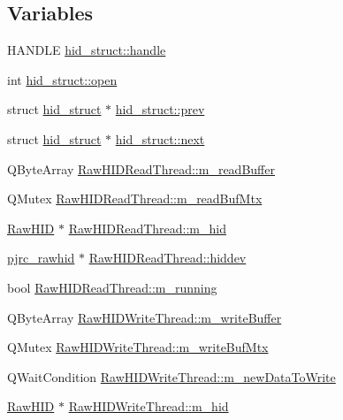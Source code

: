 \subsection*{\-Variables}
\begin{DoxyCompactItemize}
\item 
\-H\-A\-N\-D\-L\-E \hyperlink{group___raw_h_i_d_plugin_ga525aec9724c39727f65905e53be6a973}{hid\-\_\-struct\-::handle}
\item 
int \hyperlink{group___raw_h_i_d_plugin_gac3065ab2f0080eb3fe182cad3fff15ee}{hid\-\_\-struct\-::open}
\item 
struct \hyperlink{structhid__struct}{hid\-\_\-struct} $\ast$ \hyperlink{group___raw_h_i_d_plugin_gac0d9fa3480e665ae9aca8a621a1dc66d}{hid\-\_\-struct\-::prev}
\item 
struct \hyperlink{structhid__struct}{hid\-\_\-struct} $\ast$ \hyperlink{group___raw_h_i_d_plugin_gafe069ce715c9b005340052f4ea9f1a62}{hid\-\_\-struct\-::next}
\item 
\-Q\-Byte\-Array \hyperlink{group___raw_h_i_d_plugin_gaab5037bdcaa413fed7fea8c575861b1b}{\-Raw\-H\-I\-D\-Read\-Thread\-::m\-\_\-read\-Buffer}
\item 
\-Q\-Mutex \hyperlink{group___raw_h_i_d_plugin_ga5b3754efb963cd7171d34683320c01eb}{\-Raw\-H\-I\-D\-Read\-Thread\-::m\-\_\-read\-Buf\-Mtx}
\item 
\hyperlink{class_raw_h_i_d}{\-Raw\-H\-I\-D} $\ast$ \hyperlink{group___raw_h_i_d_plugin_gae4904e50399d18b7cce82e865d43dcbc}{\-Raw\-H\-I\-D\-Read\-Thread\-::m\-\_\-hid}
\item 
\hyperlink{classpjrc__rawhid}{pjrc\-\_\-rawhid} $\ast$ \hyperlink{group___raw_h_i_d_plugin_ga1a4a37b6308c6b835b62ea90dc2a37f9}{\-Raw\-H\-I\-D\-Read\-Thread\-::hiddev}
\item 
bool \hyperlink{group___raw_h_i_d_plugin_ga0b977a016ba6a452e9bdf1d49e2d89e3}{\-Raw\-H\-I\-D\-Read\-Thread\-::m\-\_\-running}
\item 
\-Q\-Byte\-Array \hyperlink{group___raw_h_i_d_plugin_ga4b0316d5c6599d45686fc5066a246e7e}{\-Raw\-H\-I\-D\-Write\-Thread\-::m\-\_\-write\-Buffer}
\item 
\-Q\-Mutex \hyperlink{group___raw_h_i_d_plugin_gaa53a045dd368b7ad82ac5853679019e0}{\-Raw\-H\-I\-D\-Write\-Thread\-::m\-\_\-write\-Buf\-Mtx}
\item 
\-Q\-Wait\-Condition \hyperlink{group___raw_h_i_d_plugin_ga1554ff98394a7da1f15042ff26061348}{\-Raw\-H\-I\-D\-Write\-Thread\-::m\-\_\-new\-Data\-To\-Write}
\item 
\hyperlink{class_raw_h_i_d}{\-Raw\-H\-I\-D} $\ast$ \hyperlink{group___raw_h_i_d_plugin_ga753f0d79e5633e60df867fe7c35dd6e4}{\-Raw\-H\-I\-D\-Write\-Thread\-::m\-\_\-hid}

\end{DoxyCompactItemize}
